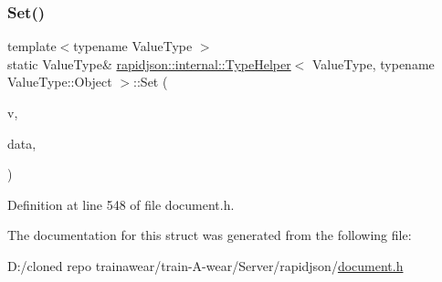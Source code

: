 \subsubsection{\texorpdfstring{Set()}{Set()}\hspace{0.1cm}{\footnotesize\ttfamily [2/2]}}
{\footnotesize\ttfamily template$<$typename Value\+Type $>$ \\
static Value\+Type\& \mbox{\hyperlink{structrapidjson_1_1internal_1_1_type_helper}{rapidjson\+::internal\+::\+Type\+Helper}}$<$ Value\+Type, typename Value\+Type\+::\+Object $>$\+::Set (\begin{DoxyParamCaption}\item[{Value\+Type \&}]{v,  }\item[{\mbox{\hyperlink{structrapidjson_1_1internal_1_1_type_helper_3_01_value_type_00_01typename_01_value_type_1_1_object_01_4_a19042ef4796b8aa989bb1d0b00624fe6}{Object\+Type}}}]{data,  }\item[{typename Value\+Type\+::\+Allocator\+Type \&}]{ }\end{DoxyParamCaption})\hspace{0.3cm}{\ttfamily [static]}}



Definition at line 548 of file document.\+h.


\begin{DoxyCode}{0}

\end{DoxyCode}


The documentation for this struct was generated from the following file\+:\begin{DoxyCompactItemize}
\item 
D\+:/cloned repo trainawear/train-\/\+A-\/wear/\+Server/rapidjson/\mbox{\hyperlink{document_8h}{document.\+h}}\end{DoxyCompactItemize}
